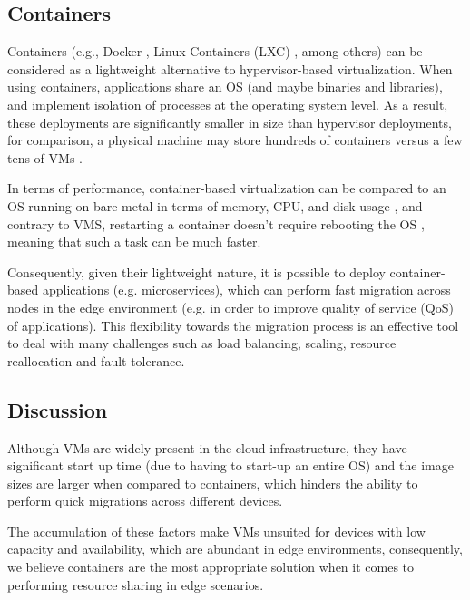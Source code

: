 \subsection{Containers}

Containers (e.g., Docker \cite{docker}, Linux Containers (LXC) \cite{lxc}, among others) can be considered as a lightweight alternative to hypervisor-based virtualization. When using containers, applications share an OS (and maybe binaries and libraries), and implement isolation of processes at the operating system level. As a result, these deployments are significantly smaller in size than hypervisor deployments, for comparison, a physical machine may store hundreds of containers versus a few tens of VMs \cite{7036275}.  

In terms of performance, container-based virtualization can be compared to an OS running on bare-metal in terms of memory, CPU, and disk usage \cite{preeth2015evaluation}, and contrary to VMS, restarting a container doesn't require rebooting the OS \cite{7036275}, meaning that such a task can be much faster.

Consequently, given their lightweight nature, it is possible to deploy container-based applications (e.g. microservices), which can perform fast migration across nodes in the edge environment (e.g. in order to improve quality of service (QoS) of applications). This flexibility towards the migration process is an effective tool to deal with many challenges such as load balancing, scaling, resource reallocation and fault-tolerance. 

\subsection{Discussion}

Although VMs are widely present in the cloud infrastructure, they have significant start up time (due to having to start-up an entire OS) and the image sizes are larger when compared to containers, which hinders the ability to perform quick migrations across different devices. 

The accumulation of these factors make VMs unsuited for devices with low capacity and availability, which are abundant in edge environments, consequently, we believe containers are the most appropriate solution when it comes to performing resource sharing in edge scenarios. 